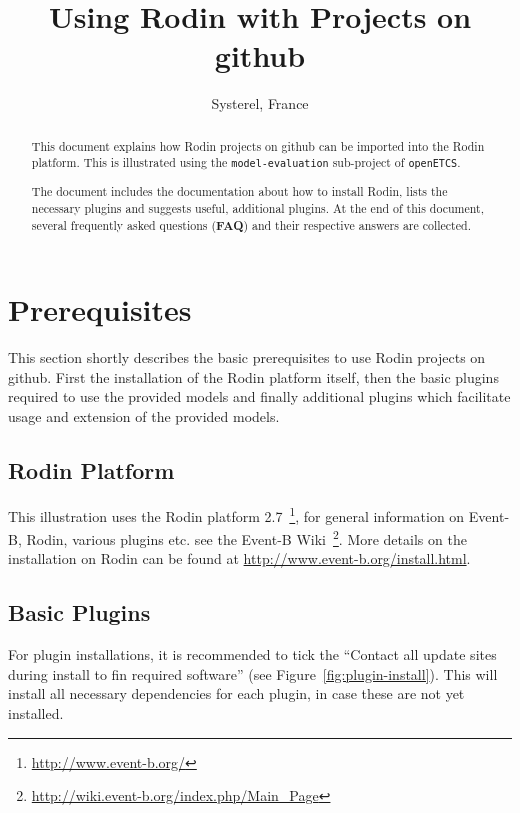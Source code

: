\documentclass[10pt,a4paper]{article}
\title{Using Rodin with Projects on github}
\author{Systerel, France}
\date{}
\begin{document}
\maketitle

\begin{abstract}
  This document explains how Rodin projects on github can be imported into the
  Rodin platform. This is illustrated using the \texttt{model-evaluation}
  sub-project of \texttt{openETCS}.

  The document includes the documentation about how to install Rodin, lists the
  necessary plugins and suggests useful, additional plugins. At the end of this
  document, several frequently asked questions ({\bf FAQ}) and their respective
  answers are collected.
\end{abstract}

\section{Prerequisites}
\label{sec:prerequisites}

This section shortly describes the basic prerequisites to use Rodin projects on
github. First the installation of the Rodin platform itself, then the basic
plugins required to use the provided models and finally additional plugins which
facilitate usage and extension of the provided models.

\subsection{Rodin Platform}
\label{sec:rodin-platform}

This illustration uses the Rodin platform
2.7~\footnote{\url{http://www.event-b.org/}}, for general information on
Event-B, Rodin, various plugins etc. see the Event-B
Wiki~\footnote{\url{http://wiki.event-b.org/index.php/Main_Page}}. More details
on the installation on Rodin can be found
at {\url{http://www.event-b.org/install.html}}.

\subsection{Basic Plugins}
\label{sec:basic-plugins}

For plugin installations, it is recommended to tick the ``Contact all update
sites during install to fin required software'' (see
Figure~\ref{fig:plugin-install}). This will install all necessary dependencies
for each plugin, in case these are not yet installed.
\end{document}

